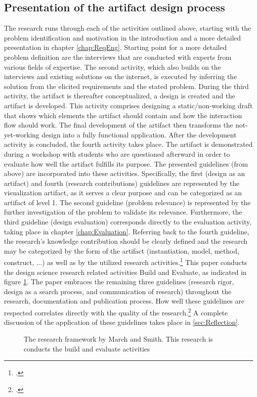 \subsection{Presentation of the artifact design process}
The research runs through each of the activities outlined above, starting with the problem identification and motivation in the introduction and a more detailed presentation in chapter \ref{chap:ReqEng}. Starting point for a more detailed problem definition are the interviews that are conducted with experts from various fields of expertise. The second activity, which also builds on the interviews and existing solutions on the internet, is executed by inferring the solution from the elicited requirements and the stated problem. During the third activity, the artifact is thereafter conceptualized, a design is created and the artifact is developed. This activity comprises designing a static/non-working draft that shows which elements the artifact should contain and how the interaction flow should work. The final development of the artifact then transforms the not-yet-working design into a fully functional application. After the development activity is concluded, the fourth activity takes place. The artifact is demonstrated during a workshop with students who are questioned afterward in order to evaluate how well the artifact fulfills its purpose. The presented guidelines (from above) are incorporated into these activities. Specifically, the first (design as an artifact) and fourth (research contributions) guidelines are represented by the visualization artifact, as it serves a clear purpose and can be categorized as an artifact of level 1. The second guideline (problem relevance) is represented by the further investigation of the problem to validate its relevance. Furthermore, the third guideline (design evaluation) corresponds directly to the evaluation activity, taking place in chapter \ref{chap:Evaluation}. Referring back to the fourth guideline, the research's knowledge contribution should be clearly defined and the research may be categorized by the form of the artifact (instantiation, model, method, construct, ...) as well as by the utilized research activities.\footcite[Cf.][p.255]{MarchDesignnaturalscience1995} This paper conducts the design science research related activities Build and Evaluate, as indicated in figure \ref{fig:researchFR}. The paper embraces the remaining three guidelines (research rigor, design as a search process, and communication of research) throughout the research, documentation and publication process. How well these guidelines are respected correlates directly with the quality of the research.\footcite[Cf.][p.19]{HevnerDesignResearchInformation2010} A complete discussion of the application of these guidelines takes place in \ref{sec:Reflection}.

\begin{figure}
    \centering
    
    \caption[The research framework by March and Smith.]{The research framework by March and Smith. This research is conducts the build and evaluate activities\protect\footnotemark}
    \label{fig:researchFR}
\end{figure}
